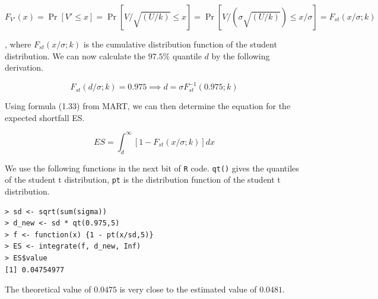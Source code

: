 \begin{displaymath}
F_{V'}(x) = \Pr[V' \le x] = \Pr[V/\sqrt{(U/k)} \le x] = \Pr[V/(\sigma \sqrt{(U/k)}) \le x/\sigma] = F_{st}(x/\sigma;k) 
\end{displaymath}

, where $F_{st}(x/\sigma;k)$ is the cumulative distribution function of the student distribution. We can now calculate the $97.5\%$ quantile $d$ by the following derivation.

\begin{displaymath}
F_{st}(d/\sigma;k) = 0.975 \implies d = \sigma F^{-1}_{st}(0.975;k) 
\end{displaymath}

Using formula (1.33) from MART, we can then determine the equation for the expected shortfall ES.

\begin{displaymath}
ES = \int_{d}^{\infty}[1-F_{st}(x/\sigma;k)]  dx
\end{displaymath}

We use the following functions in the next bit of \verb|R| code. \verb|qt()| gives the quantiles of the student t distribution, \verb|pt| is the distribution function of the student t distribution. 

\begin{verbatim}
> sd <- sqrt(sum(sigma))
> d_new <- sd * qt(0.975,5) 
> f <- function(x) {1 - pt(x/sd,5)}
> ES <- integrate(f, d_new, Inf)
> ES$value
[1] 0.04754977
\end{verbatim}

The theoretical value of $0.0475$ is very close to the estimated value of $0.0481$.